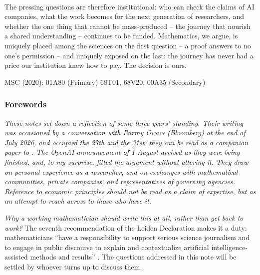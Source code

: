\documentclass[11pt, a4paper,twosided]{amsart}
\newenvironment{abstractblock}
    {\begingroup\small\color{DarkGray}
     \setlength{\leftskip}{1.6em}\setlength{\rightskip}{1.6em}
     \noindent{\bfseries\color{Navy}Abstract.}\ \ignorespaces}
    {\par\endgroup\vspace{1.2em}}
\begin{document}
\begin{abstractblock}
  
  The pressing questions are therefore institutional: who can check the claims of AI companies, what the work becomes for the next generation of researchers, and whether the one thing that cannot be mass-produced -- the journey that nourish a shared understanding -- continues to be funded. Mathematics, we argue, is uniquely placed among the sciences on the first question -- a proof answers to no one's permission -- and uniquely exposed on the last: the journey has never had a price our institution knew how to pay. The decision is ours.
\end{abstractblock}

{\small  MSC (2020): {\ttfamily 01A80 (Primary) 68T01, 68V20, 00A35 (Secondary)}}


\newpage
  \thispagestyle{empty}

  \subsubsection*{Forewords}
    {\small \itshape These notes set down a reflection of some three years' standing. Their writing was occasioned by a conversation with Parmy \textsc{Olson} (Bloomberg) at the end of July 2026, and occupied the 27th and the 31st; they can be read as a companion paper to \cite{OLS26}. The OpenAI announcement of 1 August arrived as they were being finished, and, to my surprise, fitted the argument without altering it. They draw on personal experience as a researcher, and on exchanges with mathematical communities, private companies, and representatives of governing agencies. Reference to economic principles should not be read as a claim of expertise, but as an attempt to reach across to those who have it.
    

    \emph{Why a working mathematician should write this at all, rather than get back to work?} The seventh recommendation of the Leiden Declaration makes it a duty: mathematicians ``have a responsibility to support serious science journalism and to engage in public discourse to explain and contextualize artificial intelligence-assisted methods and results'' \cite{leiden2026}. The questions addressed in this note will be settled by whoever turns up to discuss them.
    }
  
\vspace{-1em}
  \setcounter{tocdepth}{3}
  \tableofcontents

  \vspace{-2.5em}
\end{document}

